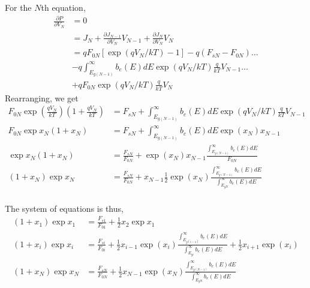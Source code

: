\documentclass[12pt]{article}
\begin{document}
For the $N$th equation, 
\begin{equation}
\begin{aligned}
\frac{\partial P}{\partial V_N} &= 0 \\
&= J_N + \frac{\partial J_{N-1}}{\partial V_N} V_{N-1} + \frac{\partial J_N}{\partial V_N} V_N \\
&= q F_{0N} \left [ \exp (q V_N/ k T) - 1 \right ] - q (F_{sN} - F_{0N})  \ldots \\
&- q \int_{E_{g(N-1)}}^{\infty} b_e(E) dE \exp (q V_N/ k T) \frac{q}{k T} V_{N-1} \ldots \\
&+  q F_{0N} \exp (q V_N/ k T) \frac{q}{k T} V_N   
\end{aligned}
\end{equation}
Rearranging, we get
\begin{equation}
\begin{aligned}
F_{0N} \exp (\frac{ q V_N}{ k T} ) \left ( 1 + \frac{ q V_N}{k T} \right ) & = F_{sN} + 
\int_{E_{g(N-1)}}^{\infty} b_e(E) dE \exp (q V_N/ k T) \frac{q}{k T} V_{N-1} \\
F_{0N} \exp x_N \left ( 1 + x_N \right ) & = F_{sN} + 
\int_{E_{g(N-1)}}^{\infty} b_e(E) dE \exp (x_N) x_{N-1} \\
 \exp x_N \left ( 1 + x_N \right ) & = \frac{F_{sN}}{F_{0N}} + 
\exp (x_N) x_{N-1} \frac{\int_{E_{g(N-1)}}^{\infty} b_e(E) dE}{F_{0N}}  \\
\left ( 1 + x_N \right ) \exp x_N  & = \frac{F_{sN}}{F_{0N}} + 
x_{N-1} \frac{1}{2} \exp (x_N)  \frac{\int_{E_{g(N-1)}}^{\infty} b_e(E) dE}{\int_{E_{gN}}^{\infty} b_e(E) dE}  \\
\end{aligned}
\end{equation}

The system of equations is thus, 
\begin{equation}
\begin{aligned}
(1 + x_1) \exp x_1  &= \frac{F_{s1}}{F_{01}} + \frac{1}{2} x_2 \exp x_1 \\
\left ( 1 + x_i \right )  \exp x_i   &= \frac{F_{si}}{F_{0i}} + 
\frac{1}{2} x_{i-1} \exp (x_i)  \frac{\int_{E_{g(i-1)}}^{\infty} b_e(E) dE}{\int_{E_{gi}}^{\infty} b_e(E) dE}   + 
\frac{1}{2} x_{i+1} \exp (x_i)   \\
\left ( 1 + x_N \right ) \exp x_N  & = \frac{F_{sN}}{F_{0N}} + 
\frac{1}{2} x_{N-1}  \exp (x_N)  \frac{\int_{E_{g(N-1)}}^{\infty} b_e(E) dE}{\int_{E_{gN}}^{\infty} b_e(E) dE}  \\
\end{aligned}
\end{equation}
\end{document}
